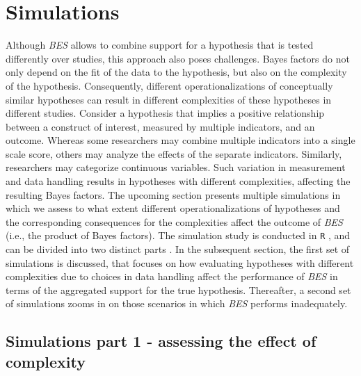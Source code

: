 \documentclass[review, 3p, authoryear]{elsarticle} %
\begin{document}
\hypertarget{simulations}{%
\section{Simulations}\label{simulations}}

Although \emph{BES} allows to combine support for a hypothesis that is tested differently over studies, this approach also poses challenges.
Bayes factors do not only depend on the fit of the data to the hypothesis, but also on the complexity of the hypothesis.
Consequently, different operationalizations of conceptually similar hypotheses can result in different complexities of these hypotheses in different studies.
Consider a hypothesis that implies a positive relationship between a construct of interest, measured by multiple indicators, and an outcome.
Whereas some researchers may combine multiple indicators into a single scale score, others may analyze the effects of the separate indicators.
Similarly, researchers may categorize continuous variables.
Such variation in measurement and data handling results in hypotheses with different complexities, affecting the resulting Bayes factors.
The upcoming section presents multiple simulations in which we assess to what extent different operationalizations of hypotheses and the corresponding consequences for the complexities affect the outcome of \emph{BES} (i.e., the product of Bayes factors).
The simulation study is conducted in \texttt{R} \citep[Version 4.1.0]{R}, and can be divided into two distinct parts \citep[a full simulation archive containing all \texttt{R}-scripts and results is available on \href{https://www.github.com/thomvolker/Master_Thesis/tree/master/MSBBSS/simulations}{GitHub};][]{ms_thesis_github}.
In the subsequent section, the first set of simulations is discussed, that focuses on how evaluating hypotheses with different complexities due to choices in data handling affect the performance of \emph{BES} in terms of the aggregated support for the true hypothesis.
Thereafter, a second set of simulations zooms in on those scenarios in which \emph{BES} performs inadequately.

\hypertarget{simulations-part-1---assessing-the-effect-of-complexity}{%
\subsection{Simulations part 1 - assessing the effect of complexity}\label{simulations-part-1---assessing-the-effect-of-complexity}}
\end{document}
